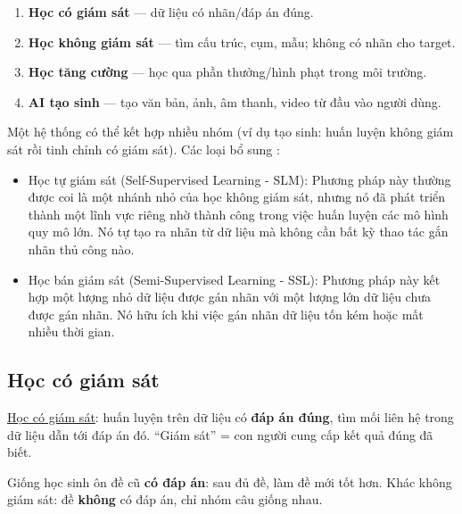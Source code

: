 \documentclass[12pt,a4paper]{article}
\begin{document}
\begin{tinhchat}[title={Bốn nhóm hệ thống ML}]
\begin{enumerate}
  \item \textbf{Học có giám sát} --- dữ liệu có nhãn/đáp án đúng.
  \item \textbf{Học không giám sát} --- tìm cấu trúc, cụm, mẫu; không có nhãn cho target.
  \item \textbf{Học tăng cường} --- học qua phần thưởng/hình phạt trong môi trường.
  \item \textbf{AI tạo sinh} --- tạo văn bản, ảnh, âm thanh, video từ đầu vào người dùng.
\end{enumerate}
Một hệ thống có thể kết hợp nhiều nhóm (ví dụ tạo sinh: huấn luyện không giám sát rồi tinh chỉnh có giám sát).
Các loại bổ sung :
\begin{itemize}
  \item Học tự giám sát (Self-Supervised Learning - SLM): Phương pháp này thường được coi là một nhánh nhỏ của học không giám sát, nhưng nó đã phát triển thành một lĩnh vực riêng nhờ thành công trong việc huấn luyện các mô hình quy mô lớn. Nó tự tạo ra nhãn từ dữ liệu mà không cần bất kỳ thao tác gắn nhãn thủ công nào.
  \item Học bán giám sát (Semi-Supervised Learning - SSL): Phương pháp này kết hợp một lượng nhỏ dữ liệu được gán nhãn với một lượng lớn dữ liệu chưa được gán nhãn. Nó hữu ích khi việc gán nhãn dữ liệu tốn kém hoặc mất nhiều thời gian.
\end{itemize}
\end{tinhchat}

\subsection{Học có giám sát}

\begin{dinhnghia}[title={Học có giám sát (supervised learning)}]
\href{https://developers.google.com/machine-learning/glossary\#supervised-machine-learning}{Học có giám sát}: huấn luyện trên dữ liệu có \textbf{đáp án đúng}, tìm mối liên hệ trong dữ liệu dẫn tới đáp án đó. ``Giám sát'' = con người cung cấp kết quả đúng đã biết.
\end{dinhnghia}

\begin{ynghia}
Giống học sinh ôn đề cũ \textbf{có đáp án}: sau đủ đề, làm đề mới tốt hơn. Khác không giám sát: đề \textbf{không} có đáp án, chỉ nhóm câu giống nhau.
\end{ynghia}
\end{document}
